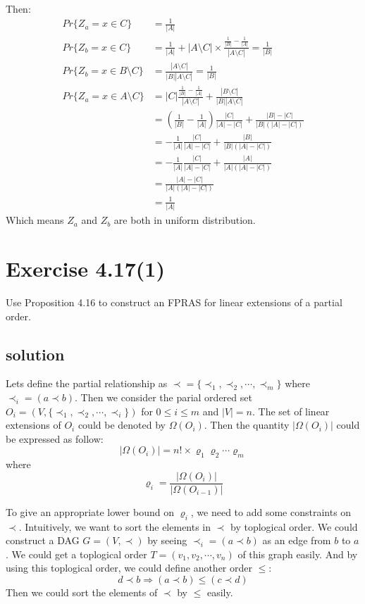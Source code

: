 \documentclass{article}
\begin{document}
Then:
\begin{align*}
  Pr\{Z_a = x\in C\} &= \frac{1}{|A|} \\
  Pr\{Z_b = x\in C\} &= \frac{1}{|A|} + |A\setminus C| \times \frac{\frac{1}{|B|} - \frac{1}{|A|}}{|A\setminus C|} = \frac{1}{|B|}\\
  Pr\{Z_b = x\in B\setminus C\} &= \frac{|A\setminus C|}{|B||A\setminus C|} = \frac{1}{|B|} \\
  Pr\{Z_a = x\in A\setminus C\} &= |C|\frac{\frac{1}{|B|} - \frac{1}{|A|}}{|A\setminus C|} + \frac{|B\setminus C|}{|B||A\setminus C|} \\
                     &= (\frac{1}{|B|}-\frac{1}{|A|})\frac{|C|}{|A| - |C|} + \frac{|B|-|C|}{|B|(|A|-|C|)}\\
                     &= -\frac{1}{|A|}\frac{|C|}{|A| - |C|} + \frac{|B|}{|B|(|A|-|C|)} \\
                     &= -\frac{1}{|A|}\frac{|C|}{|A| - |C|} + \frac{|A|}{|A|(|A|-|C|)} \\
                     &= \frac{|A| - |C|}{|A|(|A|-|C|)} \\
                     &= \frac{1}{|A|}
\end{align*}
Which means $Z_a$ and $Z_b$ are both in uniform distribution.

\section{Exercise 4.17(1)}
Use Proposition 4.16 to construct an FPRAS for linear extensions of a partial order.
\subsection{solution}
Lets define the partial relationship as $\prec = \{\prec_1, \prec_2, \cdots, \prec_m\}$ where $\prec_i = (a\prec b)$.  Then we consider the parial ordered set $O_i = (V, \{\prec_1, \prec_2, \cdots, \prec_i\})$ for $0 \leq i \leq m$ and $|V| = n$. The set of linear extensions of $O_i$ could be denoted by $\Omega(O_i)$. Then the quantity $|\Omega(O_i)|$ could be expressed as follow:
\[
  |\Omega(O_i)| = n! \times \varrho_1\varrho_2\cdots\varrho_m
\]
where
\[
  \varrho_i = \frac{|\Omega(O_{i})|}{|\Omega(O_{i-1})|}
\]

To give an appropriate lower bound on $\varrho_i$, we need to add some constraints on $\prec$. Intuitively, we want to sort the elements in $\prec$ by toplogical order. We could construct a DAG $G = (V,\prec)$ by seeing $\prec_i = (a\prec b)$ as an edge from $b$ to $a$. We could get a toplogical order $T = (v_1, v_2, \cdots, v_n)$ of this graph easily. And by using this toplogical order, we could define another order $\leq$:
\[
  d \prec b \Rightarrow (a\prec b) \leq (c\prec d)
\]
Then we could sort the elements of $\prec$ by $\leq$ easily.
\end{document}
